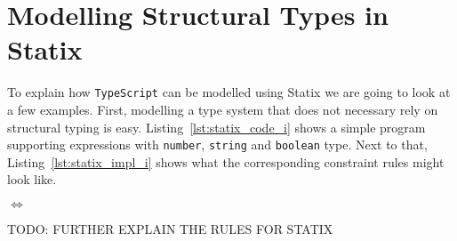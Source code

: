 \documentclass{article}
\newcommand{\ttt}[1]{\texttt{#1}}
\begin{document}
\section*{Modelling Structural Types in Statix}
To explain how \ttt{TypeScript} can be modelled using Statix we are going to look at a few examples.
First, modelling a type system that does not necessary rely on structural typing is easy.
Listing~\ref{lst:statix_code_i} shows a simple program supporting expressions with \ttt{number}, \ttt{string} and \ttt{boolean} type.
Next to that, Listing~\ref{lst:statix_impl_i} shows what the corresponding constraint rules might look like.

\noindent
\begin{minipage}{.45\textwidth}

\end{minipage}
\hfill$\Longleftrightarrow$\hfill\hfill\hfill
\begin{minipage}{.45\textwidth}

\end{minipage}

TODO: FURTHER EXPLAIN THE RULES FOR STATIX




\end{document}
